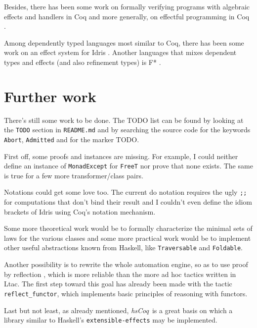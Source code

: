 \documentclass[declaration,inz,english,shortabstract]{iithesis}
\newcommand{\libname}{\textit{hsCoq}}
\newcommand{\m}[1]{\texttt{#1}}
\begin{document}
Besides, there has been some work on formally verifying programs with algebraic effects and handlers in Coq \cite{CoqEff1} \cite{CoqEff2} and more generally, on effectful programming in Coq \cite{CoqEff3}.

Among dependently typed languages most similar to Coq, there has been some work on an effect system for Idris \cite{IdrisEffects}. Another languages that mixes dependent types and effects (and also refinement types) is F* \cite{FStar}.

\section{Further work}

There's still some work to be done. The TODO list can be found by looking at the \m{TODO} section in \m{README.md} and by searching the source code for the keywords \m{Abort}, \m{Admitted} and for the marker TODO.

First off, some proofs and instances are missing. For example, I could neither define an instance of \m{MonadExcept} for \m{FreeT} nor prove that none exists. The same is true for a few more transformer/class pairs.

Notations could get some love too. The current do notation requires the ugly \m{;;} for computations that don't bind their result and I couldn't even define the idiom brackets of Idris using Coq's notation mechanism.

Some more theoretical work would be to formally characterize the minimal sets of laws for the various classes and some more practical work would be to implement other useful abstractions known from Haskell, like \m{Traversable} and \m{Foldable}.

Another possibility is to rewrite the whole automation engine, so as to use proof by reflection \cite{CPDT}, which is more reliable than the more ad hoc tactics written in Ltac. The first step toward this goal has already been made with the tactic \m{reflect\_functor}, which implements basic principles of reasoning with functors.

Last but not least, as already mentioned, \libname\ is a great basis on which a library similar to Haskell's \m{extensible-effects} may be implemented.

\end{document}
